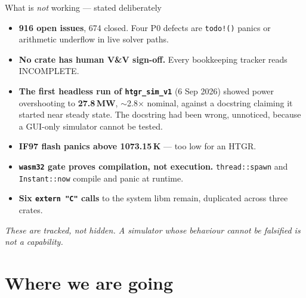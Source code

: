 \documentclass[aspectratio=169,11pt]{beamer}
\newcommand{\caveat}[1]{{\footnotesize\color{opmuted}\textit{#1}}}
\begin{document}
\begin{frame}{What is \emph{not} working --- stated deliberately}
  \begin{itemize}
    \item \textbf{916 open issues}, 674 closed. Four P0 defects are
      \texttt{todo!()} panics or arithmetic underflow in live solver paths.
    \item \textbf{No crate has human V\&V sign-off.} Every bookkeeping tracker
      reads INCOMPLETE.
    \item \textbf{The first headless run of \texttt{htgr\_sim\_v1}} (6 Sep 2026)
      showed power overshooting to \textbf{27.8\,MW}, $\sim$2.8$\times$ nominal,
      against a docstring claiming it started near steady state. The docstring had
      been wrong, unnoticed, because a GUI-only simulator cannot be tested.
    \item \textbf{IF97 flash panics above 1073.15\,K} --- too low for an HTGR.
    \item \textbf{\texttt{wasm32} gate proves compilation, not execution.}
      \texttt{thread::spawn} and \texttt{Instant::now} compile and panic at runtime.
    \item \textbf{Six \texttt{extern "C"} calls} to the system libm remain, duplicated
      across three crates.
  \end{itemize}
  \vspace{0.5em}
  \caveat{These are tracked, not hidden. A simulator whose behaviour cannot be
  falsified is not a capability.}
\end{frame}

\section{Where we are going}
\end{document}
